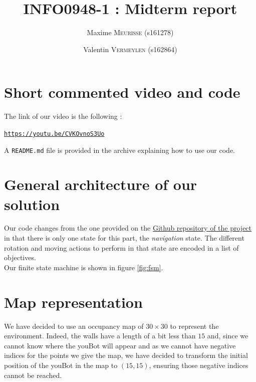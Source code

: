 \documentclass[a4paper, 10pt, conference]{ieeeconf}
\title{INFO0948-1 : Midterm report}
\author{Maxime \textsc{Meurisse} (s161278) \and Valentin \textsc{Vermeylen} (s162864)}
\begin{document}
    
    \maketitle
    \thispagestyle{plain}
    \pagestyle{plain}
    
    
    
    \section{Short commented video and code}
    
    The link of our video is the following :
    
    \begin{center}
        \href{https://youtu.be/CVKOvnoS3Uo}{\texttt{https://youtu.be/CVKOvnoS3Uo}}
    \end{center}
    
    A \texttt{README.md} file is provided in the archive explaining how to use our code.\\
    
    \section{General architecture of our solution}
    
    Our code changes from the one provided on the \href{https://github.com/ULgRobotics/trs}{Github repository of the project} in that there is only one state for this part, the \textit{navigation} state. The different rotation and moving actions to perform in that state are encoded in a list of objectives.\\
    
    Our finite state machine is shown in figure \ref{fig:fsm}.
    
    \section{Map representation}
    
    We have decided to use an occupancy map of $30\times30$ to represent the environment. Indeed, the walls have a length of a bit less than $15$ and, since we cannot know where the youBot will appear and as we cannot have negative indices for the points we give the map, we have decided to transform the initial position of the youBot in the map to $(15,15)$, ensuring those negative indices cannot be reached.\\
    
\end{document}
